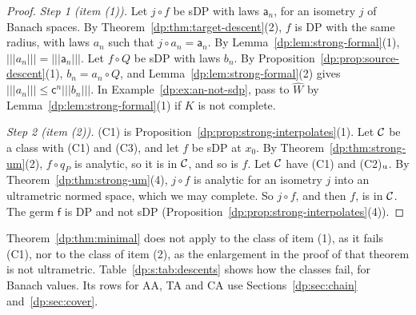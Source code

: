 \begin{proof}
\emph{Step 1 (item (1)).} Let $j\circ f$ be sDP with laws $\mathsf a_n$, for an isometry $j$ of Banach spaces. By Theorem~\ref{dp:thm:target-descent}(2), $f$ is DP with the same radius, with laws $a_n$ such that $j\circ a_n=\mathsf a_n$. By Lemma~\ref{dp:lem:strong-formal}(1), $\lvert\!\lvert\!\lvert a_n\rvert\!\rvert\!\rvert=\lvert\!\lvert\!\lvert \mathsf a_n\rvert\!\rvert\!\rvert$. Let $f\circ Q$ be sDP with laws $b_n$. By Proposition~\ref{dp:prop:source-descent}(1), $b_n=a_n\circ Q$, and Lemma~\ref{dp:lem:strong-formal}(2) gives $\lvert\!\lvert\!\lvert a_n\rvert\!\rvert\!\rvert\le\mathsf c^n\lvert\!\lvert\!\lvert b_n\rvert\!\rvert\!\rvert$. In Example~\ref{dp:ex:an-not-sdp}, pass to $\widehat W$ by Lemma~\ref{dp:lem:strong-formal}(1) if $K$ is not complete.

\emph{Step 2 (item (2)).} \textup{(C1)} is Proposition~\ref{dp:prop:strong-interpolates}(1). Let $\mathcal{C}$ be a class with \textup{(C1)} and \textup{(C3)}, and let $f$ be sDP at $x_0$. By Theorem~\ref{dp:thm:strong-um}(2), $f\circ q_P$ is analytic, so it is in $\mathcal{C}$, and so is $f$. Let $\mathcal{C}$ have \textup{(C1)} and \textup{(C2)}$_{\rm u}$. By Theorem~\ref{dp:thm:strong-um}(4), $j\circ f$ is analytic for an isometry $j$ into an ultrametric normed space, which we may complete. So $j\circ f$, and then $f$, is in $\mathcal{C}$. The germ $\mathsf f$ is DP and not sDP (Proposition~\ref{dp:prop:strong-interpolates}(4)).
\end{proof}

Theorem~\ref{dp:thm:minimal} does not apply to the class of item (1), as it fails (C1), nor to the class of item (2), as the enlargement in the proof of that theorem is not ultrametric. Table~\ref{dp:s:tab:descents} shows how the classes fail, for Banach values. Its rows for AA, TA and CA use Sections~\ref{dp:sec:chain} and~\ref{dp:sec:cover}.

